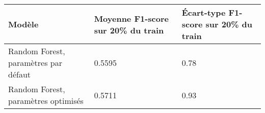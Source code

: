 \documentclass[11pt]{article}
\begin{document}
\begin{longtable}[]{@{}lll@{}}
\toprule
\begin{minipage}[b]{0.41\columnwidth}\raggedright\strut
Modèle\strut
\end{minipage} & \begin{minipage}[b]{0.26\columnwidth}\raggedright\strut
Moyenne F1-score sur 20\% du train\strut
\end{minipage} & \begin{minipage}[b]{0.24\columnwidth}\raggedright\strut
Écart-type F1-score sur 20\% du train\strut
\end{minipage}\tabularnewline
\midrule
\endhead
\begin{minipage}[t]{0.41\columnwidth}\raggedright\strut
Random Forest, paramètres par défaut\strut
\end{minipage} & \begin{minipage}[t]{0.26\columnwidth}\raggedright\strut
0.5595\strut
\end{minipage} & \begin{minipage}[t]{0.24\columnwidth}\raggedright\strut
0.78\strut
\end{minipage}\tabularnewline
\begin{minipage}[t]{0.41\columnwidth}\raggedright\strut
Random Forest, paramètres optimisés\strut
\end{minipage} & \begin{minipage}[t]{0.26\columnwidth}\raggedright\strut
0.5711\strut
\end{minipage} & \begin{minipage}[t]{0.24\columnwidth}\raggedright\strut
0.93\strut
\end{minipage}\tabularnewline
\bottomrule
\end{longtable}
\end{document}
